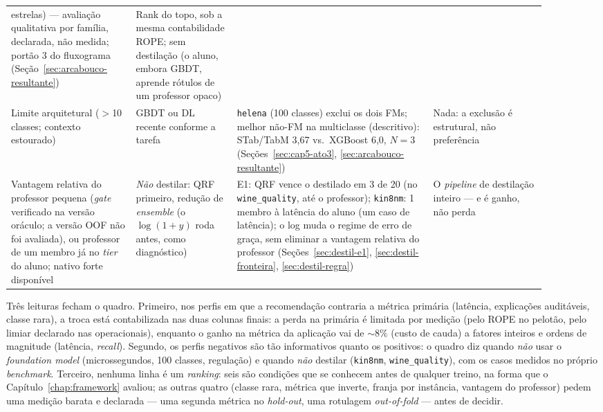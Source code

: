 \begin{table}[p]
\begin{tabular}{>{\raggedright\arraybackslash}p{0.21\linewidth}>{\raggedright\arraybackslash}p{0.17\linewidth}>{\raggedright\arraybackslash}p{0.33\linewidth}>{\raggedright\arraybackslash}p{0.19\linewidth}}
estrelas) --- avaliação qualitativa por família, declarada, não
medida; portão 3 do fluxograma
(Seção~\ref{sec:arcabouco-resultante}) &
Rank do topo, sob a mesma contabilidade ROPE; sem destilação (o
aluno, embora GBDT, aprende rótulos de um professor opaco) \\
\addlinespace[2.5pt]
Limite arquitetural ($>$10 classes; contexto estourado) &
GBDT ou DL recente conforme a tarefa &
\texttt{helena} (100 classes) exclui os dois FMs; melhor não-FM na multiclasse
(descritivo): STab/TabM 3,67 vs.\ XGBoost 6,0, $N{=}3$
(Seções~\ref{sec:cap5-ato3}, \ref{sec:arcabouco-resultante}) &
Nada: a exclusão é estrutural, não preferência \\
\addlinespace[2.5pt]
Vantagem relativa do professor pequena (\emph{gate} verificado na
versão oráculo; a versão OOF não foi avaliada), ou
professor de um membro já no \emph{tier} do aluno;
nativo forte disponível &
\emph{Não} destilar: QRF primeiro, redução de
\emph{ensemble} (o $\log(1{+}y)$ roda antes, como diagnóstico) &
E1: QRF vence o destilado em 3 de 20 (no \texttt{wine\_quality},
até o professor); \texttt{kin8nm}: 1 membro à latência do aluno (um
caso de latência); o log
muda o regime de erro de graça, sem eliminar a vantagem relativa do
professor (Seções~\ref{sec:destil-e1},
\ref{sec:destil-fronteira}, \ref{sec:destil-regra}) &
O \emph{pipeline} de destilação inteiro --- e é ganho, não perda \\
\bottomrule
\end{tabular}
\end{table}

Três leituras fecham o quadro. Primeiro, nos perfis em que a
recomendação contraria a métrica primária (latência,
explicações auditáveis, classe rara), a troca está contabilizada nas duas
colunas finais: a perda na primária
é limitada por medição (pelo ROPE no pelotão, pelo limiar declarado
nas operacionais), enquanto o ganho na métrica da aplicação vai de
${\sim}8\%$ (custo de cauda) a fatores inteiros e ordens de
magnitude (latência, \emph{recall}). Segundo, os perfis negativos
são tão informativos quanto os positivos: o quadro diz quando
\emph{não} usar o \emph{foundation model} (microssegundos, 100
classes, regulação) e quando \emph{não} destilar (\texttt{kin8nm},
\texttt{wine\_\allowbreak quality}), com os casos medidos no próprio
\emph{benchmark}. Terceiro, nenhuma linha é um
\emph{ranking}: seis são condições que se conhecem antes de qualquer
treino, na forma que o Capítulo~\ref{chap:framework} avaliou; as
outras quatro (classe rara, métrica que inverte, franja por instância,
vantagem do professor) pedem uma medição barata e declarada --- uma
segunda métrica no \emph{hold-out}, uma rotulagem
\emph{out-of-fold} --- antes de decidir.

